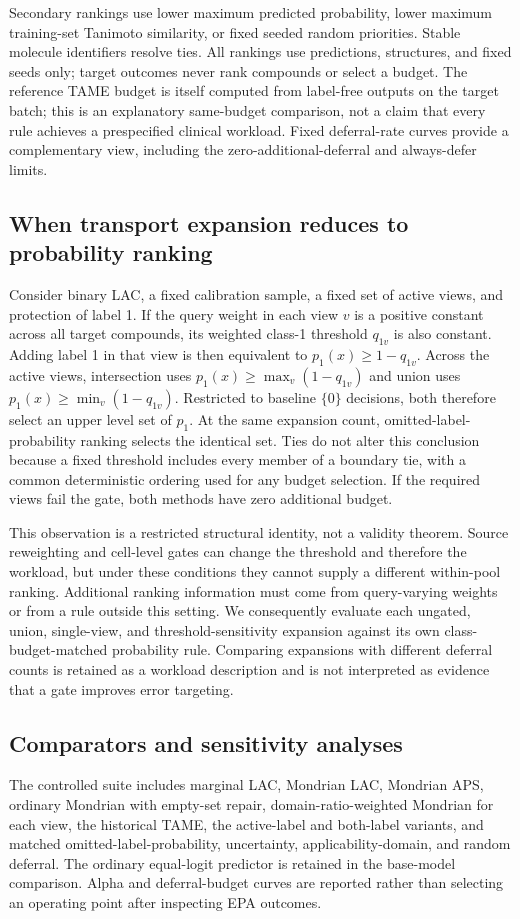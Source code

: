\documentclass[11pt]{article}
\begin{document}
Secondary rankings use lower maximum predicted probability, lower maximum training-set Tanimoto similarity, or fixed seeded random priorities. Stable molecule identifiers resolve ties. All rankings use predictions, structures, and fixed seeds only; target outcomes never rank compounds or select a budget. The reference TAME budget is itself computed from label-free outputs on the target batch; this is an explanatory same-budget comparison, not a claim that every rule achieves a prespecified clinical workload. Fixed deferral-rate curves provide a complementary view, including the zero-additional-deferral and always-defer limits.

\subsection{When transport expansion reduces to probability ranking}
Consider binary LAC, a fixed calibration sample, a fixed set of active views, and protection of label 1. If the query weight in each view $v$ is a positive constant across all target compounds, its weighted class-1 threshold $q_{1v}$ is also constant. Adding label 1 in that view is then equivalent to $p_1(x)\geq 1-q_{1v}$. Across the active views, intersection uses $p_1(x)\geq\max_v(1-q_{1v})$ and union uses $p_1(x)\geq\min_v(1-q_{1v})$. Restricted to baseline $\{0\}$ decisions, both therefore select an upper level set of $p_1$. At the same expansion count, omitted-label-probability ranking selects the identical set. Ties do not alter this conclusion because a fixed threshold includes every member of a boundary tie, with a common deterministic ordering used for any budget selection. If the required views fail the gate, both methods have zero additional budget.

This observation is a restricted structural identity, not a validity theorem. Source reweighting and cell-level gates can change the threshold and therefore the workload, but under these conditions they cannot supply a different within-pool ranking. Additional ranking information must come from query-varying weights or from a rule outside this setting. We consequently evaluate each ungated, union, single-view, and threshold-sensitivity expansion against its own class-budget-matched probability rule. Comparing expansions with different deferral counts is retained as a workload description and is not interpreted as evidence that a gate improves error targeting.

\subsection{Comparators and sensitivity analyses}
The controlled suite includes marginal LAC, Mondrian LAC, Mondrian APS, ordinary Mondrian with empty-set repair, domain-ratio-weighted Mondrian for each view, the historical TAME, the active-label and both-label variants, and matched omitted-label-probability, uncertainty, applicability-domain, and random deferral. The ordinary equal-logit predictor is retained in the base-model comparison. Alpha and deferral-budget curves are reported rather than selecting an operating point after inspecting EPA outcomes.
\end{document}
